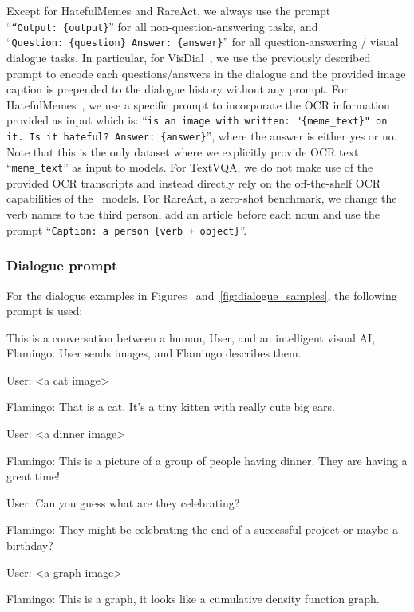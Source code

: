 Except for HatefulMemes and RareAct, we always use the prompt ``\texttt{\color{greencode}``Output:~\{output\}}'' for all non-question-answering tasks, and ``\texttt{\color{greencode}Question:~\{question\}\color{greencode}~Answer:~\{answer\}}'' for all question-answering / visual dialogue tasks.
In particular, for VisDial~\citep{das2017visual}, we use the previously described prompt to encode each questions/answers in the dialogue and the provided image caption is prepended to the dialogue history without any prompt.
For HatefulMemes~\citep{kiela2020hateful}, we use a specific prompt to incorporate the OCR information provided as input which is: ``\texttt{\color{greencode}is an image with written:~"\{meme\_text\}" on it. Is it hateful?\color{greencode}~Answer:~\{answer\}}'', where the answer is either yes or no.
Note that this is the only dataset where we explicitly provide OCR text ``\texttt{\color{greencode}meme\_text}'' as input to \method{} models.
For TextVQA, we do not make use of the provided OCR transcripts and instead directly rely on the off-the-shelf OCR capabilities of the~\method{} models.
For RareAct, a zero-shot benchmark, we change the verb names to the third person, add an article before each noun and use the prompt ``\texttt{\color{greencode}Caption: a person~\{verb + object\}}''.




\subsubsection{Dialogue prompt}
\label{app:dialogue_prompt}

For the dialogue examples in Figures~ and~\ref{fig:dialogue_samples}, the following prompt is used:

{\selectfont 
This is a conversation between a human, User, and an intelligent visual AI, Flamingo. User sends images, and Flamingo describes them.

User: <a cat image>

Flamingo: That is a cat. It's a tiny kitten with really cute big ears.

User: <a dinner image>

Flamingo: This is a picture of a group of people having dinner. They are having a great time!

User: Can you guess what are they celebrating?

Flamingo: They might be celebrating the end of a successful project or maybe a birthday?

User: <a graph image>

Flamingo: This is a graph, it looks like a cumulative density function graph.}




